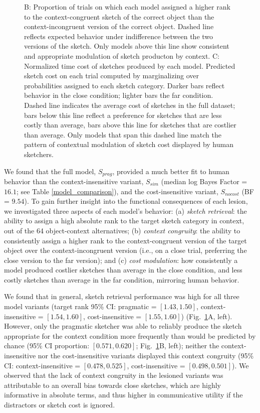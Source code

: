 \documentclass[9pt,twocolumn,twoside]{pnas-new}
\begin{document}
\begin{figure}[htbp]
{B: Proportion of trials on which each model assigned a higher rank to the context-congruent sketch of the correct object than the context-incongruent version of the correct object. 
Dashed line reflects expected behavior under indifference between the two versions of the sketch. 
Only models above this line show consistent and appropriate modulation of sketch producton by context. 
C: Normalized time cost of sketches produced by each model.
Predicted sketch cost on each trial computed by marginalizing over probabilities assigned to each sketch category. 
Darker bars reflect behavior in the close condition; lighter bars the far condition. 
Dashed line indicates the average cost of sketches in the full dataset; bars below this line reflect a preference for sketches that are less costly than average, bars above this line for sketches that are costlier than average. 
Only models that span this dashed line match the pattern of contextual modulation of sketch cost displayed by human sketchers.}
\label{model_results}
\end{figure}

We found that the full model, $S_{prag}$, provided a much better fit to human behavior than the context-insensitive variant, $S_{sim}$ (median log Bayes Factor = $16.1$; see Table \ref{model_comparison}), and the cost-insensitive variant, $S_{nocost}$ (BF = $9.54$).
To gain further insight into the functional consequences of each lesion, we investigated three aspects of each model's behavior: (a) \textit{sketch retrieval}: the ability to assign a high absolute rank to the target sketch category in context, out of the 64 object-context alternatives; (b) \textit{context congruity}: the ability to consistently assign a higher rank to the context-congruent version of the target object over the context-incongruent version (i.e., on a close trial, preferring the close version to the far version); and (c) \textit{cost modulation}: how consistently a model produced costlier sketches than average in the close condition, and less costly sketches than average in the far condition, mirroring human behavior.

We found that in general, sketch retrieval performance was high for all three model variants (target rank 95\% CI: pragmatic = $[1.43, 1.50]$, context-insensitive = $[1.54, 1.60]$, cost-insensitive = $[1.55, 1.60]$) (Fig.~\ref{model_results}A, left).
However, only the pragmatic sketcher was able to reliably produce the sketch appropriate for the context condition more frequently than would be predicted by chance (95\% CI proportion: $[0.571, 0.620]$; Fig.~\ref{model_results}B, left); neither the context-insensitive nor the cost-insensitive variants displayed this context congruity (95\% CI: context-insensitive = $[0.478, 0.525]$, cost-insensitive = $[0.498, 0.501]$). 
We observed that the lack of context congruity in the lesioned variants was attributable to an overall bias towards close sketches, which are highly informative in absolute terms, and thus higher in communicative utility if the distractors or sketch cost is ignored. 
\end{document}
